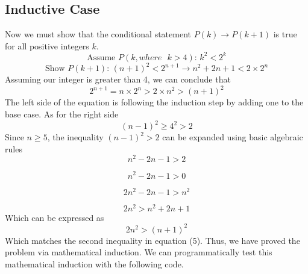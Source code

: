 \documentclass{article}
\begin{document}
\subsection{Inductive Case}
Now we must show that the conditional statement $P(k) \rightarrow P(k+1)$ is true for all positive integers $k$.
\newline
\newline
\begin{equation}
\textrm{Assume  } P(k, where \textrm{ } k>4)\textrm{:   } k^2 < 2^k
\end{equation}
\newline
\newline
\begin{equation}
\textrm{Show  } P(k+1)\textrm{:   } (n+1)^2 < 2^{n+1} \rightarrow n^2 + 2n + 1 < 2 \times 2^n
\end{equation}
\newline
Assuming our integer is greater than 4, we can conclude that
\begin{equation}
2^{n+1} = n \times 2^n > 2 \times n^2 > (n+1)^2
\end{equation}
\newline
The left side of the equation is following the induction step by adding one to the base case. As for the right side
\begin{equation}
(n-1)^2 \ge 4^2 > 2
\end{equation}
\newline
Since $n \ge 5$, the inequality $(n-1)^2 > 2$ can be expanded using basic algebraic rules
\begin{equation}
n^2 - 2n - 1 > 2 
\end{equation}

\begin{equation}
n^2 - 2n - 1 > 0
\end{equation}

\begin{equation}
2n^2 - 2n - 1 > n^2
\end{equation}

\begin{equation}
2n^2 > n^2 + 2n + 1 
\end{equation}
\newline
Which can be expressed as
\begin{equation}
2n^2 > (n+1)^2 
\end{equation}
\newline
Which matches the second inequality in equation (5). Thus, we have proved the problem via mathematical induction. We can programmatically test this mathematical induction with the following code.
\end{document}
